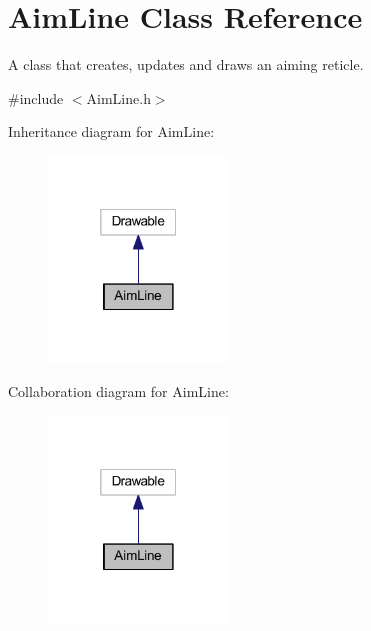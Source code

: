 \hypertarget{class_aim_line}{}\section{Aim\+Line Class Reference}
\label{class_aim_line}


A class that creates, updates and draws an aiming reticle.  




{\ttfamily \#include $<$Aim\+Line.\+h$>$}



Inheritance diagram for Aim\+Line\+:\nopagebreak
\begin{figure}[H]
\begin{center}
\leavevmode
\includegraphics[width=136pt]{class_aim_line__inherit__graph}
\end{center}
\end{figure}


Collaboration diagram for Aim\+Line\+:\nopagebreak
\begin{figure}[H]
\begin{center}
\leavevmode
\includegraphics[width=136pt]{class_aim_line__coll__graph}
\end{center}
\end{figure}
